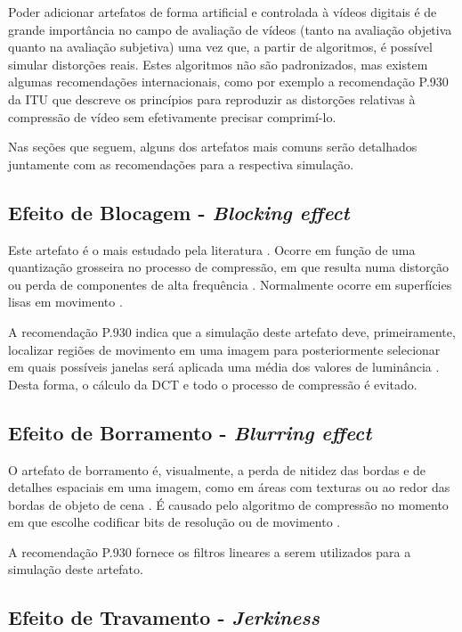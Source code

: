 Poder adicionar artefatos de forma artificial e controlada à vídeos digitais é de grande importância no campo de avaliação de vídeos (tanto na avaliação objetiva quanto na avaliação subjetiva) uma vez que, a partir de algoritmos, é possível simular distorções reais. Estes algoritmos não são padronizados, mas existem algumas recomendações internacionais, como por exemplo a recomendação P.930 da ITU \cite{itup930} que descreve os princípios para reproduzir as distorções relativas à compressão de vídeo sem efetivamente precisar comprimí-lo.

Nas seções que seguem, alguns dos artefatos mais comuns serão detalhados juntamente com as recomendações para a respectiva simulação.

\subsection{Efeito de Blocagem - \emph{Blocking effect}}

Este artefato é o mais estudado pela literatura \cite{emmersonsilva}. Ocorre em função de uma quantização grosseira no processo de compressão, em que resulta numa distorção ou perda de componentes de alta frequência \cite{itup930}. Normalmente ocorre em superfícies lisas em movimento \cite{itup930} \cite{farias2007}.

A recomendação P.930 indica que a simulação deste artefato deve, primeiramente, localizar regiões de movimento em uma imagem para posteriormente selecionar em quais possíveis janelas será aplicada uma média dos valores de luminância \cite{itup930}. Desta forma, o cálculo da DCT e todo o processo de compressão é evitado.

\subsection{Efeito de Borramento - \emph{Blurring effect}}

O artefato de borramento é, visualmente, a perda de nitidez das bordas e de detalhes espaciais em uma imagem, como em áreas com texturas ou ao redor das bordas de objeto de cena \cite{wurao2005}. É causado pelo algoritmo de compressão no momento em que escolhe codificar bits de resolução ou de movimento \cite{itup930}.

A recomendação P.930 fornece os filtros lineares a serem utilizados para a simulação deste artefato.

\subsection{Efeito de Travamento - \emph{Jerkiness}}

